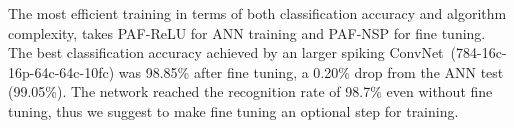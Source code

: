 \documentclass{article}
\begin{document}
	
	
	
	
	The most efficient training in terms of both classification accuracy and algorithm complexity, takes PAF-ReLU for ANN training and PAF-NSP for fine tuning.
	The best classification accuracy achieved by an larger spiking ConvNet~(784-16c-16p-64c-64c-10fc) was 98.85\% after fine tuning, a 0.20\% drop from the ANN test (99.05\%).
	The network reached the recognition rate of 98.7\% even without fine tuning, thus we suggest to make fine tuning an optional step for training.
\end{document}
